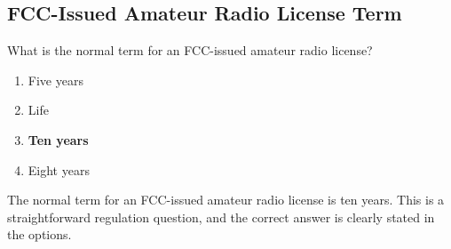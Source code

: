 \subsection{FCC-Issued Amateur Radio License Term}
\label{T1C08}

\begin{tcolorbox}[colback=gray!10!white,colframe=black!75!black,title=T1C08]
What is the normal term for an FCC-issued amateur radio license?
\begin{enumerate}[label=\Alph*),noitemsep]
    \item Five years
    \item Life
    \item \textbf{Ten years}
    \item Eight years
\end{enumerate}
\end{tcolorbox}

The normal term for an FCC-issued amateur radio license is ten years. This is a straightforward regulation question, and the correct answer is clearly stated in the options.